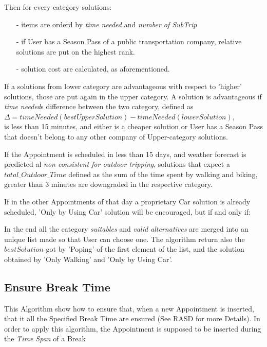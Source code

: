 	Then for every category solutions:
	\begin{itemize}
		\item[-] items are orderd by \textit{time needed} and \textit{number of SubTrip}
		\item[-] if User has a Season Pass of a public transportation company, relative solutions are put on the highest rank.
		\item[-] solution cost are calculated, as aforementioned.
	\end{itemize}		
		
	If a solutions from lower category are advantageous with respect to 'higher' solutions, those are put again in the upper category.
	A solution is advantageous if \textit{time needed}s difference between the two category, defined as 
	\\ \quad $\Delta =  timeNeeded(bestUpperSolution) - timeNeeded(lowerSolution)$, \\
	is less than 15 minutes, and either is a cheaper solution or User has a Season Pass that doesn't belong to any other company of Upper-category solutions.
		
	If the Appointment is scheduled in less than 15 days, and weather forecast is predicted al \textit{non consistent for outdoor tripping}, solutions that expect a $total\_Outdoor\_Time$ defined as the sum of the time spent by walking and biking, greater than 3 minutes are downgraded in the respective category.

	If in the other Appointments of that day a proprietary Car solution is already scheduled, 'Only by Using Car' solution will be encouraged, but if and only if:

	In the end all the category \textit{suitables} and \textit{valid alternatives} are merged into an unique list made so that User can choose one.
	The algorithm return also the $bestSolution$ got by 'Poping' of the first element of the list, and the solution obtained by 'Only Walking' and 'Only by Using Car'.
	
	\vfill
	
	\vfill

	
	
\subsection{Ensure Break Time}
	This Algorithm show how to ensure that, when a new Appointment is inserted, that it all the Specified Break Time are ensured (See RASD for more Details).
	In order to apply this algorithm, the Appointment is supposed to be inserted during the \textit{Time Span} of a Break
	
